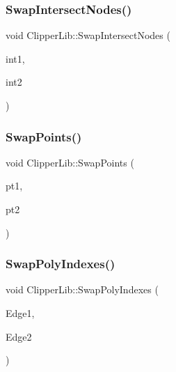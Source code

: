 \subsubsection{\texorpdfstring{SwapIntersectNodes()}{SwapIntersectNodes()}}
{\footnotesize\ttfamily void Clipper\+Lib\+::\+Swap\+Intersect\+Nodes (\begin{DoxyParamCaption}\item[{\mbox{\hyperlink{struct_clipper_lib_1_1_intersect_node}{Intersect\+Node}} \&}]{int1,  }\item[{\mbox{\hyperlink{struct_clipper_lib_1_1_intersect_node}{Intersect\+Node}} \&}]{int2 }\end{DoxyParamCaption})}

\mbox{\label{namespace_clipper_lib_af8338b22ca335b55a1fc1a17f0b0c453}} 
\subsubsection{\texorpdfstring{SwapPoints()}{SwapPoints()}}
{\footnotesize\ttfamily void Clipper\+Lib\+::\+Swap\+Points (\begin{DoxyParamCaption}\item[{\mbox{\hyperlink{struct_clipper_lib_1_1_int_point}{Int\+Point}} \&}]{pt1,  }\item[{\mbox{\hyperlink{struct_clipper_lib_1_1_int_point}{Int\+Point}} \&}]{pt2 }\end{DoxyParamCaption})}

\mbox{\label{namespace_clipper_lib_a17c02161ee129cdb347b0a6a18a73849}} 
\subsubsection{\texorpdfstring{SwapPolyIndexes()}{SwapPolyIndexes()}}
{\footnotesize\ttfamily void Clipper\+Lib\+::\+Swap\+Poly\+Indexes (\begin{DoxyParamCaption}\item[{\mbox{\hyperlink{struct_clipper_lib_1_1_t_edge}{T\+Edge}} \&}]{Edge1,  }\item[{\mbox{\hyperlink{struct_clipper_lib_1_1_t_edge}{T\+Edge}} \&}]{Edge2 }\end{DoxyParamCaption})\hspace{0.3cm}{\ttfamily [inline]}}

